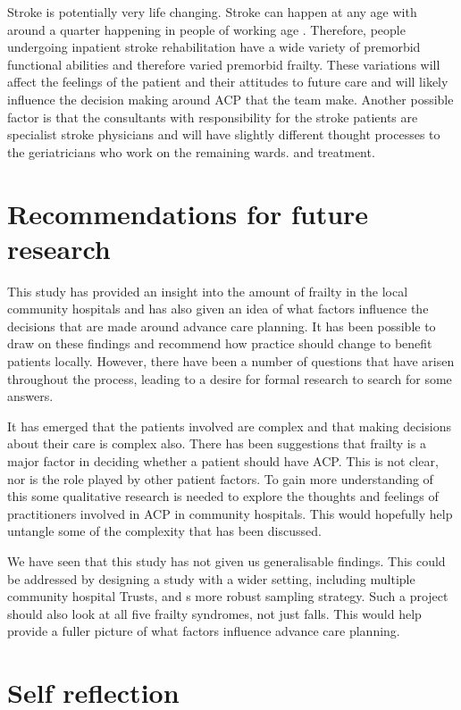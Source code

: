 \documentclass
[
	12pt,
	a4paper,
	oneside,
]{report}
\begin{document}
Stroke is potentially very life changing. Stroke can happen at any age with 
around a quarter happening in people of working age \parencite{stroke:18}. 
Therefore, people undergoing 
inpatient stroke rehabilitation have a wide variety of premorbid functional 
abilities and therefore varied premorbid frailty. These variations will
affect the feelings of the patient and their attitudes to future care and will
likely influence the decision making around ACP that the team make. Another
possible factor is that the consultants with responsibility for the stroke 
patients are specialist stroke physicians and will have slightly different 
thought processes to the geriatricians who work on the remaining wards.
and treatment.

\section{Recommendations for future research}

This study has provided an insight into the amount of frailty in the local
community hospitals and has also given an idea of what factors influence the 
decisions that are made around advance care planning. It has been possible to
draw on these findings and recommend how practice should change to benefit
patients locally. However, there have been a number of questions that have 
arisen throughout the process, leading to a desire for formal research to 
search for some answers. 

It has emerged that the patients involved are complex and that making decisions
about their care is complex also. There has been suggestions that frailty is 
a major factor in deciding whether a patient should have ACP. This is not
clear, nor is the role played by other patient factors. To gain more 
understanding of this some qualitative research is needed 
to explore the thoughts and feelings of practitioners involved in ACP in
community hospitals. This would hopefully help untangle some of the complexity
that has been discussed.

We have seen that this study has not given us generalisable findings. This
could be addressed by designing a study with a wider setting, including
multiple community hospital Trusts, and s more robust sampling strategy. 
Such a project should
also look at all five frailty syndromes, not just falls. This would help
provide a fuller picture of what factors influence advance care planning.

\section{Self reflection}
\end{document}
